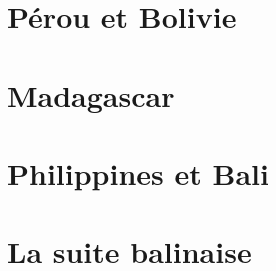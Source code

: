 \documentclass[a4paper, 10pt]{book}
\begin{document}
\begin{spacing}{1}

\chapter{Pérou et Bolivie}
%

\pagebreak
\pagebreak
\pagebreak

\chapter{Madagascar}

\pagebreak
\pagebreak
\pagebreak

\chapter{Philippines et Bali}

\pagebreak
\pagebreak
\pagebreak
\pagebreak

\chapter{La suite balinaise}



\end{spacing}
\backmatter
\end{document}
